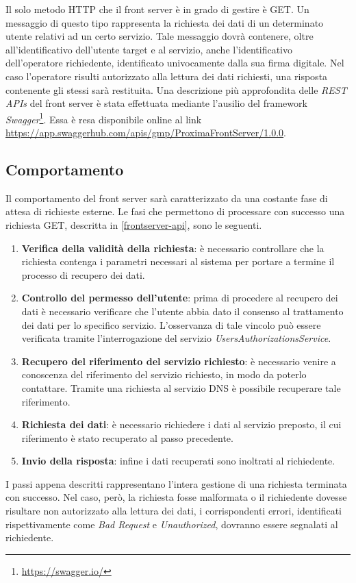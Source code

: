 \documentclass[a4paper,12pt]{report}
\begin{document}
Il solo metodo HTTP che il front server è in grado di gestire è GET. Un messaggio di questo tipo rappresenta la richiesta dei dati di un determinato utente relativi ad un certo servizio. Tale messaggio dovrà contenere, oltre all'identificativo dell'utente target e al servizio, anche l'identificativo dell'operatore richiedente, identificato univocamente dalla sua firma digitale. Nel caso l'operatore risulti autorizzato alla lettura dei dati richiesti, una risposta contenente gli stessi sarà restituita. Una descrizione più approfondita delle \emph{REST APIs} del front server è stata effettuata mediante l'ausilio del framework \emph{Swagger}\footnote{\url{https://swagger.io/}}. Essa è resa disponibile online al link \url{https://app.swaggerhub.com/apis/gmp/ProximaFrontServer/1.0.0}.

\subsection{Comportamento} \label{frontserver-behaviour}
Il comportamento del front server sarà caratterizzato da una costante fase di attesa di richieste esterne. Le fasi che permettono di processare con successo una richiesta GET, descritta in \autoref{frontserver-api}, sono le seguenti.
\begin{enumerate}
	\item \textbf{Verifica della validità della richiesta}: è necessario controllare che la richiesta contenga i parametri necessari al sistema per portare a termine il processo di recupero dei dati.
	\item \textbf{Controllo del permesso dell'utente}: prima di procedere al recupero dei dati è necessario verificare che l'utente abbia dato il consenso al trattamento dei dati per lo specifico servizio. L'osservanza di tale vincolo può essere verificata tramite l'interrogazione del servizio \emph{UsersAuthorizationsService}.
	\item \textbf{Recupero del riferimento del servizio richiesto}: è necessario venire a conoscenza del riferimento del servizio richiesto, in modo da poterlo contattare. Tramite una richiesta al servizio DNS è possibile recuperare tale riferimento.
	\item \textbf{Richiesta dei dati}: è necessario richiedere i dati al servizio preposto, il cui riferimento è stato recuperato al passo precedente.
	\item \textbf{Invio della risposta}: infine i dati recuperati sono inoltrati al richiedente.
\end{enumerate}
I passi appena descritti rappresentano l'intera gestione di una richiesta terminata con successo. Nel caso, però, la richiesta fosse malformata o il richiedente dovesse risultare non autorizzato alla lettura dei dati, i corrispondenti errori, identificati rispettivamente come \emph{Bad Request} e \emph{Unauthorized}, dovranno essere segnalati al richiedente.
\end{document}
